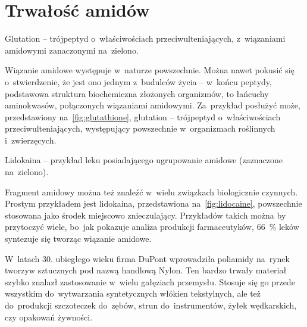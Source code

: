\section{Trwałość amidów}\label{literature:amide-stability}
\begin{marginfigure}[7\baselineskip]
  \caption{
    Glutation \--- trójpeptyd o~właściwościach przeciwulteniających,
    z~wiązaniami amidowymi zanaczonymi na~zielono.
  }
  \label{fig:glutathione}
\end{marginfigure}
Wiązanie amidowe występuje w~naturze powszechnie.
Można nawet pokusić się o~stwierdzenie, że jest ono jednym z~budulców życia \---
  w~końcu peptydy, podstawowa struktura biochemiczna złożonych organizmów,
  to łańcuchy aminokwasów, połączonych wiązaniami amidowymi.
Za~przykład posłużyć może, przedstawiony na~\cref{fig:glutathione}, glutation \---
  trójpeptyd o~właściwościach przeciwulteniających,
  występujący powszechnie w~organizmach roślinnych i~zwierzęcych.
  
\begin{marginfigure}
  \caption{
    Lidokaina \--- przykład leku posiadającego ugrupowanie amidowe
    (zaznaczone na~zielono).
  }
  \label{fig:lidocaine}
\end{marginfigure}
Fragment amidowy można też znaleźć w~wielu związkach biologicznie czynnych.
Prostym przykładem jest lidokaina, przedstawiona na~\cref{fig:lidocaine},
  powszechnie stosowana jako środek miejscowo znieczulający.
Przykładów takich można by przytoczyć wiele, bo~jak pokazuje analiza produkcji farmaceutyków,
  \SI{66}{\percent} leków syntezuje się tworząc wiązanie amidowe.

W~latach 30. ubiegłego wieku firma DuPont wprowadziła poliamidy na~rynek tworzyw
  sztucznych pod nazwą handlową Nylon.
Ten bardzo trwały materiał szybko znalazł zastosowanie w~wielu gałęziach przemysłu.
Stosuje się go przede wszystkim do~wytwarzania syntetycznych włókien tekstylnych,
  ale też do~produkcji szczoteczek do~zębów, strun do~instrumentów,
  żyłek wędkarskich, czy opakowań żywności.

